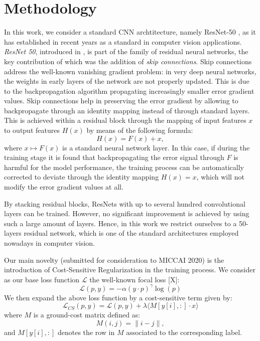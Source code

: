 \section{Methodology}
In this work, we consider a standard CNN archtitecture, namely ResNet-50 \cite{he_deep_2016}, as it
has established in recent years as a standard in computer vision applications. \textit{ResNet 50}, introduced in \cite{he_deep_2016}, is part of the family of residual neural networks, the key contribution of which was the addition of \textit{skip connections}. Skip connections address the well-known vanishing gradient problem: in very deep neural networks, the weights in early layers of the network are not properly updated. This is due to the backpropagation algorithm propagating increasingly smaller error gradient values. Skip connections help in preserving the error gradient by allowing to backpropagate through an identity mapping instead of through standard layers. 
This is achieved within a residual block through the mapping of input features $x$ to output features $H(x)$ by means of the following formula:
\begin{equation*}
H(x) = F(x)+x,
\end{equation*}
where $x\mapsto F(x)$ is a standard neural network layer. In this case, if during the training stage it is found that backpropagating the error signal through $F$ is harmful for the model performance, the training process can be automatically corrected to deviate through the identity mapping $H(x)=x$, which will not modify the error gradient values at all.

By stacking residual blocks, ResNets with up to several hundred convolutional layers can be trained. 
However, no significant improvement is achieved by using such a large amount of layers. 
Hence, in this work we restrict ourselves to a 50-layers residual network, which is one of the standard architectures employed nowadays in computer vision.

Our main novelty (submitted for consideration to MICCAI 2020) is the introduction of Cost-Sensitive Regularization in the training process. We consider as our base loss function $\mathcal{L}$ the well-known focal loss [X]:
\begin{equation}
\mathcal{L}(p,y) = -\alpha (y \cdot p)^\gamma \log(p)
\end{equation}
We then expand the above loss function by a cost-sensitive term given by:
\begin{equation}
\mathcal{L}_{CS}(p,y) = \mathcal{L}(p,y) + \lambda \langle M[y[i],:]\cdot x\rangle
\end{equation}
where $M$ is a ground-cost matrix defined as:
\begin{equation}
M(i,j) = \|i-j\|,
\end{equation}
and $M[y[i],:]$ denotes the row in $M$ associated to the corresponding label.

